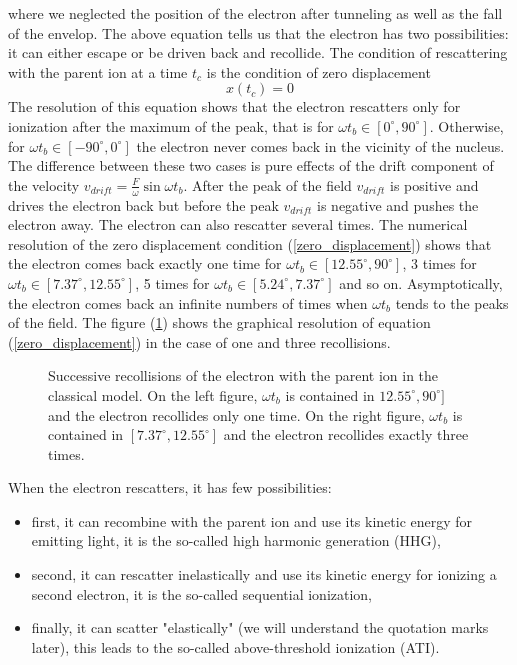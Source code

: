 \documentclass[a4paper]{article}
\begin{document}
where we neglected the position of the electron after tunneling as well as the fall of the envelop.
The above equation tells us that the electron has two possibilities: it can either escape or be driven back and recollide. The condition of rescattering with the parent ion at a time $t_{c}$ is the condition of zero displacement
\begin{equation}
\label{zero_displacement}
x(t_{c})=0 
\end{equation}
The resolution of this equation shows that the electron rescatters only for ionization after the maximum of the peak, that is for $\omega t_{b} \in [0^{\circ},90^{\circ}]$. Otherwise, for $\omega t_{b} \in [-90^{\circ},0^{\circ}]$ the electron never comes back in the vicinity of the nucleus. The difference between these two cases is pure effects of the drift component of the velocity $v_{drift}=\frac{F}{\omega}\sin{\omega t_{b}}$. After the peak  of the field $v_{drift}$ is positive and drives the electron back but before the peak $v_{drift}$ is negative and pushes the electron away.
The electron can also rescatter several times. The numerical resolution of the zero displacement condition (\ref{zero_displacement}) shows that the electron comes back exactly one time for $\omega t_{b} \in [12.55^{\circ},90^{\circ}]$, 3 times for $\omega t_{b} \in [7.37^{\circ},12.55^{\circ}]$, 5 times for $\omega t_{b} \in [5.24^{\circ},7.37^{\circ}]$ and so on. Asymptotically, the electron comes back an infinite numbers of times when $\omega t_{b}$ tends to the peaks of the field. The figure (\ref{successive_recollision}) shows the graphical resolution of equation (\ref{zero_displacement}) in the case of one and three recollisions.
\begin{figure}
\centering
 
 \caption{Successive recollisions of the electron with the parent ion in the classical model. On the left figure, $\omega t_{b}$ is contained in $12.55^{\circ},90^{\circ}]$ and the electron recollides only one time. On the right figure, $\omega t_{b}$ is contained in $[7.37^{\circ},12.55^{\circ}]$ and the electron recollides exactly three times.}
 \label{successive_recollision} 
\end{figure}
\par 
When the electron rescatters, it has few possibilities:
\begin{itemize}
\item
first, it can recombine with the parent ion and use its kinetic energy for emitting light, it is the so-called high harmonic generation (HHG),
\item
second, it can rescatter inelastically and use its kinetic energy for ionizing a second electron, it is the so-called sequential ionization,
\item
finally, it can scatter "elastically" (we will understand the quotation marks later), this leads to the so-called above-threshold ionization (ATI).
\end{itemize}
\end{document}
